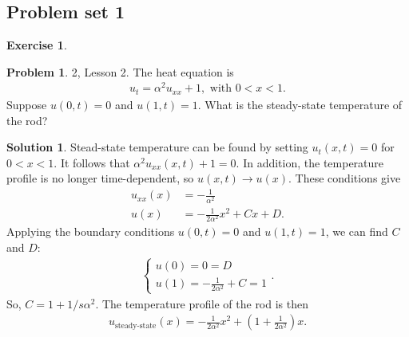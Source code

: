 \documentclass{article}
\theoremstyle{definition}
\newtheorem*{prob*}{Problem}
\newtheorem*{exer*}{Exercise}
\newtheorem*{sln*}{Solution}
\begin{document}
\subsection{Problem set 1}
\begin{exer*}
	\begin{prob*}2, Lesson 2.
		The heat equation is
		\begin{align*}
		u_t = \alpha^2 u_{xx} + 1, \text{ with }0 < x < 1.
		\end{align*}
		Suppose $u(0,t) = 0$ and $u(1,t) = 1$. What is the steady-state temperature of the rod?\\
		\begin{sln*}
			Stead-state temperature can be found by setting $u_t(x,t) = 0$ for $0 < x < 1$. It follows that $\alpha^2 u_{xx}(x,t) + 1 = 0$. In addition, the temperature profile is no longer time-dependent, so $u(x,t)\to u(x)$. These conditions give
			\begin{align*}
			u_{xx}(x) &= -\frac{1}{\alpha^2}\\
			u(x) &= -\frac{1}{2\alpha^2}x^2 + Cx + D.
			\end{align*} 
			Applying the boundary conditions $u(0,t)=0$ and $u(1,t)=1$, we can find $C$ and $D$:
			\begin{align*}
			\begin{cases}
			u(0) = 0 = D\\
			u(1) = -\frac{1}{2\alpha^2} + C = 1
			\end{cases}.
			\end{align*}
			So, $C = 1 + 1/s\alpha^2$. The temperature profile of the rod is then
			\begin{align*}
			u_{\text{steady-state}}(x) = -\frac{1}{2\alpha^2}x^2 + \left(1 + \frac{1}{2\alpha^2} \right)x .
			\end{align*}
		\end{sln*}
	\end{prob*}
	
	\newpage
	

\end{exer*}
\end{document}
